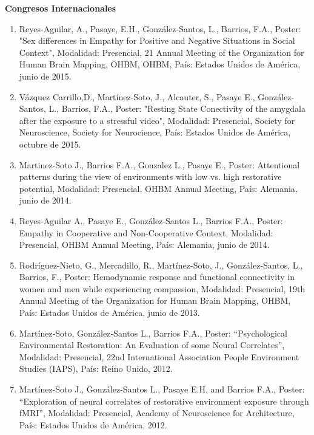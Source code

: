 \textbf{Congresos Internacionales}

\hfill

\begin{enumerate}

\item Reyes-Aguilar, A., Pasaye, E.H., González-Santos, L., Barrios, F.A., Poster: "Sex differences in Empathy for Positive 
and Negative Situations in Social Context", Modalidad: Presencial, 21 Annual Meeting of the Organization for Human Brain 
Mapping, OHBM, OHBM, País: Estados Unidos de América, junio de 2015.

\item Vázquez Carrillo,D., Martínez-Soto, J., Alcauter, S., Pasaye E., González-Santos, L., Barrios, F.A., Poster: "Resting 
State Conectivity of the amygdala after the exposure to a stressful video", Modalidad: Presencial, Society for 
Neuroscience, Society for Neurocience, País: Estados Unidos de América, octubre de 2015.

\item Martinez-Soto J., Barrios F.A., Gonzalez L., Pasaye E., Poster: Attentional patterns during the view of environments with low vs. high 
restorative potential, Modalidad: Presencial, OHBM Annual Meeting, País: 
Alemania, junio de 2014.

\item Reyes-Aguilar A., Pasaye E., González-Santos L., Barrios F.A., Poster: Empathy in Cooperative and Non-Cooperative 
Context, Modalidad: Presencial, OHBM Annual Meeting, País: Alemania, junio de 2014.

\item Rodríguez-Nieto, G., Mercadillo, R., Martínez-Soto, J., González-Santos, L., Barrios, F., Poster: Hemodynamic response 
and functional connectivity in women and men while experiencing compassion, Modalidad: Presencial, 19th Annual Meeting of 
the Organization for Human Brain Mapping, OHBM, País: Estados Unidos de América, junio de 2013.

\item Martínez-Soto, González-Santos L., Barrios F.A., Poster: “Psychological Environmental Restoration: An Evaluation of some 
Neural Correlates”, Modalidad: Presencial, 22nd International Association People Environment Studies (IAPS), País: Reino 
Unido,  2012.

\item Martínez-Soto J., González-Santos L., Pasaye E.H. and Barrios F.A., Poster: “Exploration of neural correlates of 
restorative environment exposure through fMRI”, Modalidad: Presencial, Academy of Neuroscience for Architecture, País: 
Estados Unidos de América, 2012.


\end{enumerate}
